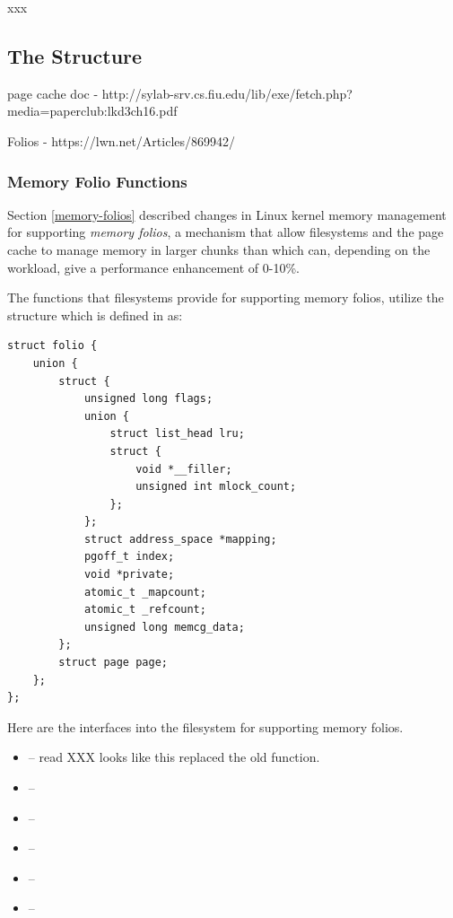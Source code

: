 \noindent
xxx


\subsection{The  Structure}

page cache doc - http://sylab-srv.cs.fiu.edu/lib/exe/fetch.php?media=paperclub:lkd3ch16.pdf 

Folios - https://lwn.net/Articles/869942/


\subsubsection{Memory Folio Functions}

Section \ref{memory-folios} described changes in Linux kernel memory management for supporting \textit{memory folios}, a mechanism that allow filesystems and the page cache to manage memory in larger chunks than  which can, depending on the workload, give a performance enhancement of 0-10\%.

The functions that filesystems provide for supporting memory folios, utilize the  structure which is defined in  as:

\begin{lstlisting}
struct folio {
    union {
        struct {
            unsigned long flags;
            union {
                struct list_head lru;
                struct { 
                    void *__filler;
                    unsigned int mlock_count;
                };
            };
            struct address_space *mapping;
            pgoff_t index;
            void *private;
            atomic_t _mapcount;
            atomic_t _refcount;
            unsigned long memcg_data; 
        };
        struct page page;
    };
};
\end{lstlisting}

\noindent
Here are the interfaces into the filesystem for supporting memory folios.

\begin{itemize}
    \item {} -- read XXX looks like this replaced the old  function.
    \item {} --
    \item {} --
    \item {} --
    \item {} --
    \item {} --
\end{itemize}

